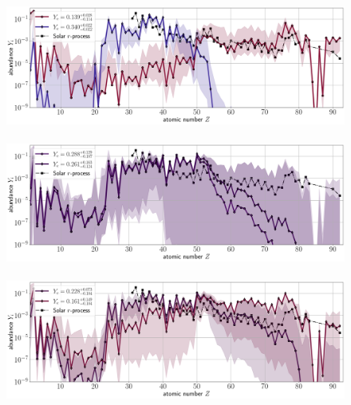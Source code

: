 \documentclass[twocolumn,twocolappendix]{aastex63}
\begin{document}
\begin{figure}[!ht]
    \centering {\ } \\ %
    \centering {\ } \\ %
    \centering {} \\
    \includegraphics[width=\textwidth]{figs/compare-components//compare_abunds_230103_064024_components_dynesty_100samples.png} \\
    \centering {} \\
    \includegraphics[width=\textwidth]{figs/compare-components//compare_abunds_230103_060017_components_dynesty_100samples.png} \\
    \centering {} \\
    \includegraphics[width=\textwidth]{figs/compare-components//compare_abunds_230622_230103_components_dynesty_100samples.png}\\

\end{figure}
\end{document}
